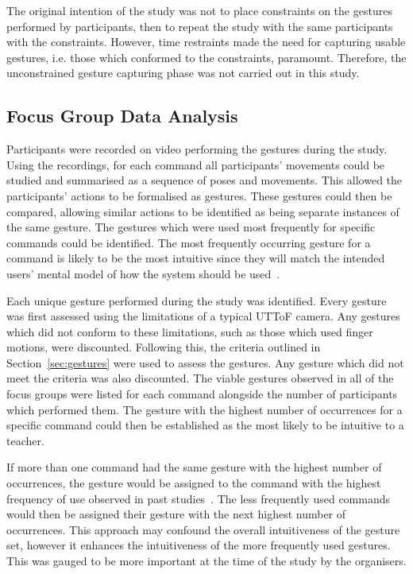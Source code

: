 \documentclass[manuscript, review, screen]{acmart}
\begin{document}
The original intention of the study was not to place constraints on the gestures performed by participants, then to repeat the study with the same participants with the constraints.
However, time restraints made the need for capturing usable gestures, i.e. those which conformed to the constraints, paramount.
Therefore, the unconstrained gesture capturing phase was not carried out in this study.

\subsection{Focus Group Data Analysis}
\label{subsec:analysis}  

Participants were recorded on video performing the gestures during the study.
Using the recordings, for each command all participants' movements could be studied and summarised as a sequence of poses and movements.
This allowed the participants' actions to be formalised as gestures.
These gestures could then be compared, allowing similar actions to be identified as being separate instances of the same gesture.
The gestures which were used most frequently for specific commands could be identified.
The most frequently occurring gesture for a command is likely to be the most intuitive since they will match the intended users' mental model of how the system should be used~\citep{Nielsen2004,Ruiz2011,Wobbrock2009}.

Each unique gesture performed during the study was identified.
Every gesture was first assessed using the limitations of a typical \ac{UTToF} camera.
Any gestures which did not conform to these limitations, such as those which used finger motions, were discounted.
Following this, the criteria outlined in Section~\ref{sec:gestures} were used to assess the gestures.
Any gesture which did not meet the criteria was also discounted.
The viable gestures observed in all of the focus groups were listed for each command alongside the number of participants which performed them.
The gesture with the highest number of occurrences for a specific command could then be established as the most likely to be intuitive to a teacher.

If more than one command had the same gesture with the highest number of occurrences, the gesture would be assigned to the command with the highest frequency of use observed in past studies~\citep{HatchA.HigginsS&Mercier2009}.
The less frequently used commands would then be assigned their gesture with the next highest number of occurrences.
This approach may confound the overall intuitiveness of the gesture set, however it enhances the intuitiveness of the more frequently used gestures.
This was gauged to be more important at the time of the study by the organisers.
\end{document}
